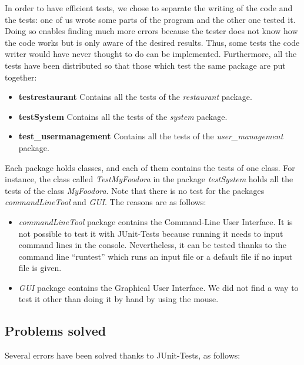 In order to have efficient tests, we chose to separate the writing of the code and the tests: one of us wrote some parts of the program and the other one tested it. Doing so enables finding much more errors because the tester does not know how the code works but is only aware of the desired results. Thus, some tests the code writer would have never thought to do can be implemented.
Furthermore, all the tests have been distributed so that those which test the same package are put together:
\begin{itemize}
	\item{\textbf{testrestaurant}} Contains all the tests of the \textit{restaurant} package.
	\item{\textbf{testSystem}} Contains all the tests of the  \textit{system} package.
	\item{\textbf{test\_usermanagement}} Contains all the tests of the \textit{user\_management} package.
\end{itemize}
Each package holds classes, and each of them contains the tests of one class. For instance, the class called \textit{TestMyFoodora} in the package \textit{testSystem} holds all the tests of the class \textit{MyFoodora}.  
Note that there is no test for the packages \textit{commandLineTool} and \textit{GUI}. The reasons are as follows:
\begin{itemize}
	\item{\textit{commandLineTool}} package contains the Command-Line User Interface. It is not possible to test it with JUnit-Tests because running it needs to input command lines in the console. Nevertheless, it can be tested thanks to the command line ``runtest'' which runs an input file or a default file if no input file is given.
	\item{\textit{GUI}} package contains the Graphical User Interface. We did not find a way to test it other than doing it by hand by using the mouse.
\end{itemize}

\subsection{Problems solved}
\label{sub:problems_solved}

Several errors have been solved thanks to JUnit-Tests, as follows:

